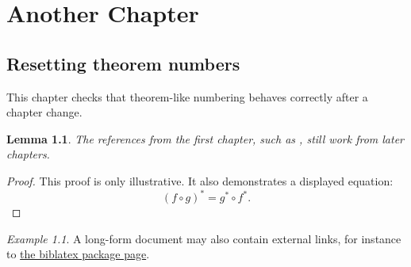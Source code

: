 \documentclass[12pt,a4paper]{report}
\theoremstyle{plain}
\newtheorem{lemma}[theorem]{Lemma}
\theoremstyle{definition}
\theoremstyle{remark}
\newtheorem{example}[theorem]{Example}
\numberwithin{equation}{section}
\newif\ifshowtodos
\newcommand{\todo}[1]{%
    \ifshowtodos
        \noindent{\color{red}\usym{26A0} #1}%
    \fi
}
\begin{document}
\chapter{Another Chapter}

\section{Resetting theorem numbers}

This chapter checks that theorem-like numbering behaves correctly after a
chapter change.
\todo{Here is a to-do note.}

\begin{lemma}
    \label{lemma:second-chapter}
    The references from the first chapter, such as
    , still work from later chapters.
\end{lemma}

\begin{proof}
    This proof is only illustrative. It also demonstrates a displayed equation:
    \begin{equation}
        \label{equation:pull-back}
        (f \circ g)^* = g^* \circ f^* .
    \end{equation}
\end{proof}


\begin{example}
    \label{example:external-link}
    A long-form document may also contain external links, for instance to
    \href{https://www.ctan.org/pkg/biblatex}{the biblatex package page}.
\end{example}


\printbibliography
\end{document}
